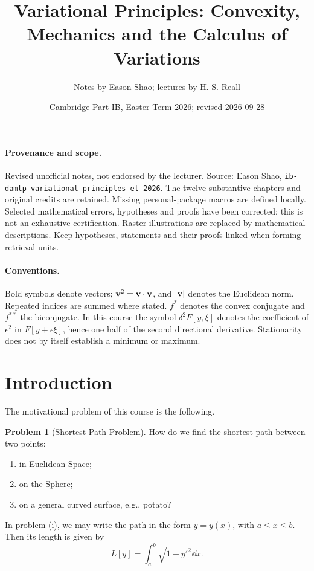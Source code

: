 \documentclass[11pt]{article}
\title{Variational Principles: Convexity, Mechanics and the Calculus of Variations}
\author{Notes by Eason Shao; lectures by H. S. Reall}
\date{Cambridge Part IB, Easter Term 2026; revised 2026-09-28}
\numberwithin{equation}{section}
\theoremstyle{definition}
\newtheorem{problem}[theorem]{Problem}
\theoremstyle{remark}
\newcommand{\pqty}[1]{\left(#1\right)}
\newcommand{\bqty}[1]{\left[#1\right]}
\begin{document}
\maketitle
\paragraph{Provenance and scope.}
Revised unofficial notes, not endorsed by the lecturer. Source: Eason Shao,
\texttt{ib-damtp-variational-principles-et-2026}. The twelve substantive chapters
and original credits are retained. Missing personal-package macros are defined locally.
Selected mathematical errors, hypotheses and proofs have been corrected; this is not an
exhaustive certification. Raster illustrations are replaced by mathematical descriptions.
Keep hypotheses, statements and their proofs linked when forming retrieval units.
\paragraph{Conventions.}
Bold symbols denote vectors; \(\vb v^2=\vb v\cdot\vb v\), and \(|\vb v|\) denotes
the Euclidean norm. Repeated indices are summed where stated. \(f^*\) denotes the
convex conjugate and \(f^{**}\) the biconjugate. In this course the symbol
\(\delta^2F[y,\xi]\) denotes the coefficient of \(\epsilon^2\) in
\(F[y+\epsilon\xi]\), hence one half of the second directional derivative.
Stationarity does not by itself establish a minimum or maximum.
\tableofcontents
\section*{Introduction}

The motivational problem of this course is the following.

\begin{problem}[Shortest Path Problem]\label{variation-unit-0001}
    \label{prob:shortest-path}%
    How do we find the shortest path between two points:
    \begin{enumerate}
        \item in Euclidean Space;
        \item on the Sphere;
        \item on a general curved surface, e.g., potato?
    \end{enumerate}
\end{problem}

In problem (i), we may write the path in the form \(y = y\pqty{x}\), with \(a \leq x \leq b\). Then its length is given by
\[
    L \bqty{y} = \int_{a}^{b} \sqrt{1 + y'^2} \dd{x}.
\]
\end{document}
